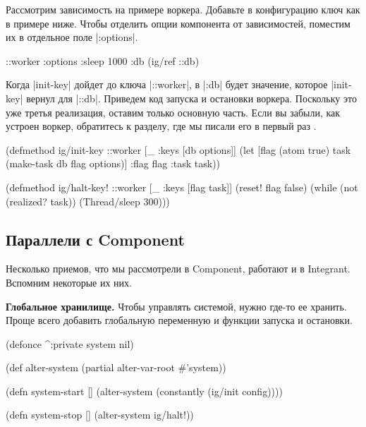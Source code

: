 Рассмотрим зависимость на примере воркера. Добавьте в конфигурацию ключ как в
примере ниже. Чтобы отделить опции компонента от зависимостей, поместим их в
отдельное поле \spverb|:options|.

\begin{english}
  \begin{clojure}
{::worker {:options {:sleep 1000}
           :db (ig/ref ::db)}}
  \end{clojure}
\end{english}

Когда \spverb|init-key| дойдет до ключа \spverb|::worker|, в \spverb|:db| будет
значение, которое \spverb|init-key| вернул для \spverb|::db|. Приведем код
запуска и остановки воркера. Поскольку это уже третья реализация, оставим только
основную часть. Если вы забыли, как устроен воркер, обратитесь к разделу, где мы
писали его в первый раз .

\begin{english}
  \begin{clojure}
(defmethod ig/init-key ::worker
  [_ {:keys [db options]}]
  (let [flag (atom true)
        task (make-task db flag options)]
    {:flag flag :task task}))

(defmethod ig/halt-key! ::worker
  [_ {:keys [flag task]}]
  (reset! flag false)
  (while (not (realized? task))
    (Thread/sleep 300)))
  \end{clojure}
\end{english}

\subsection{Параллели с Component}

Несколько приемов, что мы рассмотрели в Component, работают и в
Integrant. Вспомним некоторые их них.

\textbf{Глобальное хранилище.} Чтобы управлять системой, нужно где-то ее
хранить. Проще всего добавить глобальную переменную и функции запуска и
остановки.

\begin{english}
  \begin{clojure}
(defonce ^:private system nil)

(def alter-system (partial alter-var-root #'system))

(defn system-start []
  (alter-system (constantly (ig/init config))))

(defn system-stop []
  (alter-system ig/halt!))
  \end{clojure}
\end{english}

